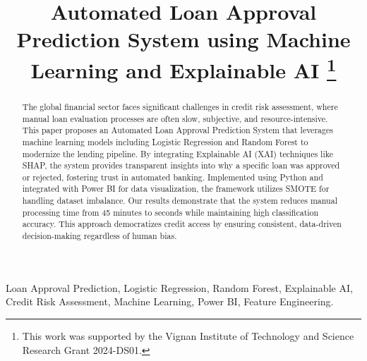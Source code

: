 \documentclass[conference]{IEEEtran}
\begin{document}
\title{Automated Loan Approval Prediction System using Machine Learning and Explainable AI
\thanks{This work was supported by the Vignan Institute of Technology and Science Research Grant 2024-DS01.}
}

\author{
}

\maketitle

\begin{abstract}
The global financial sector faces significant challenges in credit risk assessment, where manual loan evaluation processes are often slow, subjective, and resource-intensive. This paper proposes an Automated Loan Approval Prediction System that leverages machine learning models including Logistic Regression and Random Forest to modernize the lending pipeline. By integrating Explainable AI (XAI) techniques like SHAP, the system provides transparent insights into why a specific loan was approved or rejected, fostering trust in automated banking.
Implemented using Python and integrated with Power BI for data visualization, the framework utilizes SMOTE for handling dataset imbalance. Our results demonstrate that the system reduces manual processing time from 45 minutes to seconds while maintaining high classification accuracy. This approach democratizes credit access by ensuring consistent, data-driven decision-making regardless of human bias.
\end{abstract}

\begin{IEEEkeywords}
Loan Approval Prediction, Logistic Regression, Random Forest, Explainable AI, Credit Risk Assessment, Machine Learning, Power BI, Feature Engineering.\end{IEEEkeywords}
\end{document}
